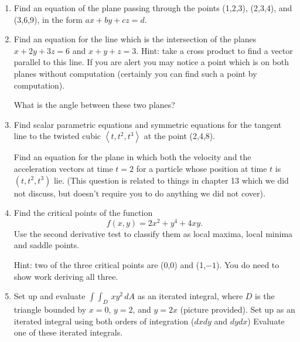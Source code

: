 \documentclass[12pt]{article}
\begin{document}
\begin{enumerate}

\item  Find an  equation of the plane passing through the points (1,2,3),  (2,3,4), and (3,6,9), in the form $ax+by+cz=d$.

\newpage

\item  Find an equation for the line which is the intersection of the planes $x+2y+3z=6$ and $x+y+z=3$.  Hint:  take a cross product to find a vector parallel to this line.  If you are alert you may notice a point which is on both planes without computation (certainly you can find such a point by computation).


\vspace{3 in}

What is the angle between these two planes?

\newpage

\item  Find scalar parametric equations and symmetric equations for the tangent line to the twisted cubic $\left<t,t^2,t^3\right>$ at the point (2,4,8).

\vspace{3 in}

Find an equation for the plane in which both the velocity and the acceleration vectors at time $t=2$ for a particle whose position at time $t$ is $(t,t^2,t^3)$ lie.  (This question is related to things in chapter 13 which we did not discuss, but doesn't require you to do anything we did not cover).



\newpage

\item  Find the  critical points of the function $$f(x,y)=2x^2+y^4+4xy.$$  Use the second derivative test to classify them as local maxima, local minima and saddle points.

Hint:  two of the three critical points are (0,0) and (1,$-1$).  You do need to show work deriving all three.

\newpage

\item  Set up and evaluate $\int\int_D \, xy^2 \, dA$ as an iterated integral, where $D$ is the triangle bounded by
$x=0$, $y=2$, and $y=2x$ (picture provided).  Set up as an iterated integral using  both orders of integration ($dxdy$ and $dydx$)   Evaluate one of these iterated integrals.

\newpage


\end{enumerate}
\end{document}
